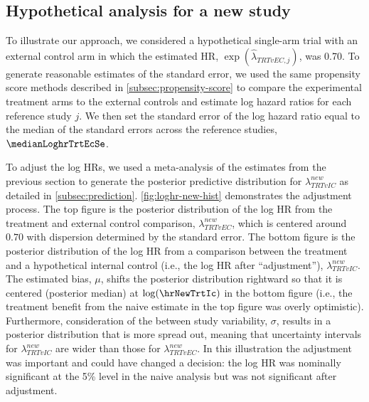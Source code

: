 \documentclass[11pt,final,fleqn]{article}\usepackage[]{graphicx}\usepackage[]{color}
\begin{document}
\subsection{Hypothetical analysis for a new study}
To illustrate our approach, we considered a hypothetical single-arm trial with an external control arm in which the estimated HR, $\exp(\hat{\lambda}_{TRTvEC,j})$, was 0.70. To generate reasonable estimates of the standard error, we used the same propensity score methods described in \autoref{subsec:propensity-score} to compare the experimental treatment arms to the external controls and estimate log hazard ratios for each reference study $j$. We then set the standard error of the log hazard ratio equal to the median of the standard errors across the reference studies, $\medianLoghrTrtEcSe$.

To adjust the log HRs, we used a meta-analysis of the estimates from the previous section to generate the posterior predictive distribution for $\lambda^{new}_{TRTvIC}$ as detailed in \autoref{subsec:prediction}. \autoref{fig:loghr-new-hist} demonstrates the adjustment process.\cite{gabry2019visualization} The top figure is the posterior distribution of the log HR from the treatment and external control comparison, $\lambda^{new}_{TRTvEC}$, which is centered around $0.70$ with dispersion determined by the standard error. The bottom figure is the posterior distribution of the log HR from a comparison between the treatment and a hypothetical internal control (i.e., the log HR after ``adjustment''), $\lambda^{new}_{TRTvIC}$. The estimated bias, $\mu$, shifts the posterior distribution rightward so that it is centered (posterior median) at $\log(\hrNewTrtIc)$ in the bottom figure (i.e., the treatment benefit from the naive estimate in the top figure was overly optimistic). Furthermore, consideration of the between study variability, $\sigma$, results in a posterior distribution that is more spread out, meaning that uncertainty intervals for $\lambda^{new}_{TRTvIC}$ are wider than those for $\lambda^{new}_{TRTvEC}$. In this illustration the adjustment was important and could have changed a decision: the log HR was nominally significant at the 5\% level in the naive analysis but was not significant after adjustment.
\end{document}
